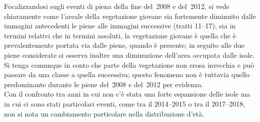 Focalizzandosi sugli eventi di piena della fine del~2008 e del~2012, si vede chiaramente come l'areale della vegetazione giovane sia fortemente diminuito dalle immagini antecedenti le piene alle immagini successive (tratti \numrange[range-phrase={ e }]{11}{17});
sia in termini relativi che in termini assoluti, la vegetazione giovane è quella che è prevalentemente portata via dalle piene, quando è presente;
in seguito alle due piene considerate si osserva inoltre una diminuzione dell'area occupata dalle isole.
Si tenga comunque in conto che parte della vegetazione non erosa invecchia e può passare da una classe a quella successiva; questo fenomeno non è tuttavia quello predominante durante le piene del~2008 e del~2012 per evidenza.
\\
Con il confronto tra anni in cui non c'è stata una forte espansione delle isole ma in cui ci sono stati particolari eventi, come tra il \numrange[range-phrase={ e il }]{2014}{2015} o tra il \numrange[range-phrase={ e il }]{2017}{2018}, non si nota un cambiamento particolare nella distribuzione d'età.


















